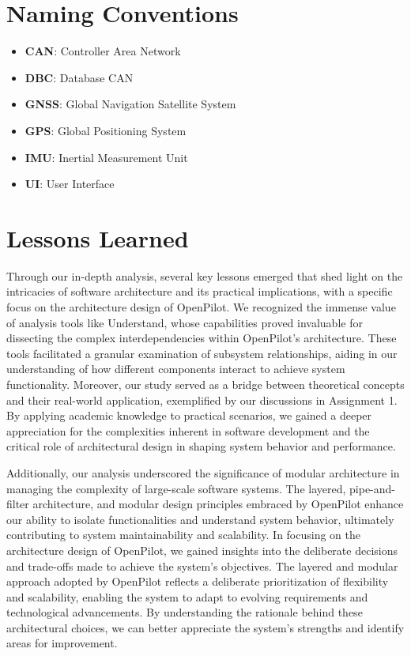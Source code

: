 \documentclass[12pt]{article}
\begin{document}
\section{Naming Conventions}

    \begin{itemize}

        \item[] \textbf{CAN}: Controller Area Network
        \item[] \textbf{DBC}: Database CAN
        \item[] \textbf{GNSS}: Global Navigation Satellite System
        \item[] \textbf{GPS}: Global Positioning System
        \item[] \textbf{IMU}: Inertial Measurement Unit
        \item[] \textbf{UI}: User Interface
        

    \end{itemize}

\section{Lessons Learned}
Through our in-depth analysis, several key lessons emerged that shed light on the intricacies of software architecture and its practical implications, with a specific focus on the architecture design of OpenPilot. We recognized the immense value of analysis tools like Understand, whose capabilities proved invaluable for dissecting the complex interdependencies within OpenPilot's architecture. These tools facilitated a granular examination of subsystem relationships, aiding in our understanding of how different components interact to achieve system functionality. Moreover, our study served as a bridge between theoretical concepts and their real-world application, exemplified by our discussions in Assignment 1. By applying academic knowledge to practical scenarios, we gained a deeper appreciation for the complexities inherent in software development and the critical role of architectural design in shaping system behavior and performance.

Additionally, our analysis underscored the significance of modular architecture in managing the complexity of large-scale software systems. The layered, pipe-and-filter architecture, and modular design principles embraced by OpenPilot enhance our ability to isolate functionalities and understand system behavior, ultimately contributing to system maintainability and scalability. In focusing on the architecture design of OpenPilot, we gained insights into the deliberate decisions and trade-offs made to achieve the system's objectives. The layered and modular approach adopted by OpenPilot reflects a deliberate prioritization of flexibility and scalability, enabling the system to adapt to evolving requirements and technological advancements. By understanding the rationale behind these architectural choices, we can better appreciate the system's strengths and identify areas for improvement.
\end{document}
